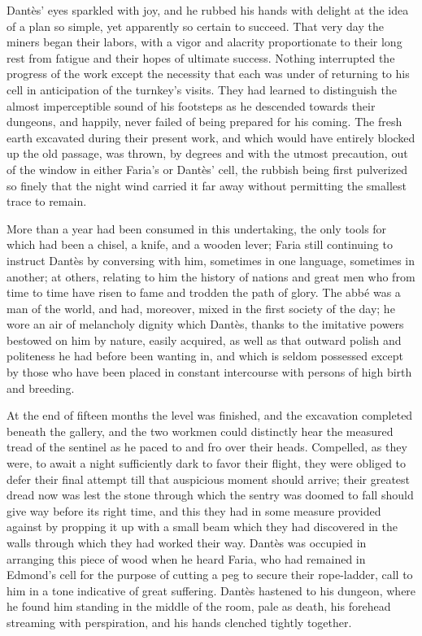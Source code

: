 Dantès’ eyes sparkled with joy, and he rubbed his hands with delight at
the idea of a plan so simple, yet apparently so certain to succeed.
That very day the miners began their labors, with a vigor and alacrity
proportionate to their long rest from fatigue and their hopes of
ultimate success. Nothing interrupted the progress of the work except
the necessity that each was under of returning to his cell in
anticipation of the turnkey’s visits. They had learned to distinguish
the almost imperceptible sound of his footsteps as he descended towards
their dungeons, and happily, never failed of being prepared for his
coming. The fresh earth excavated during their present work, and which
would have entirely blocked up the old passage, was thrown, by degrees
and with the utmost precaution, out of the window in either Faria’s or
Dantès’ cell, the rubbish being first pulverized so finely that the
night wind carried it far away without permitting the smallest trace to
remain.

More than a year had been consumed in this undertaking, the only tools
for which had been a chisel, a knife, and a wooden lever; Faria still
continuing to instruct Dantès by conversing with him, sometimes in one
language, sometimes in another; at others, relating to him the history
of nations and great men who from time to time have risen to fame and
trodden the path of glory. The abbé was a man of the world, and had,
moreover, mixed in the first society of the day; he wore an air of
melancholy dignity which Dantès, thanks to the imitative powers
bestowed on him by nature, easily acquired, as well as that outward
polish and politeness he had before been wanting in, and which is
seldom possessed except by those who have been placed in constant
intercourse with persons of high birth and breeding.

At the end of fifteen months the level was finished, and the excavation
completed beneath the gallery, and the two workmen could distinctly
hear the measured tread of the sentinel as he paced to and fro over
their heads. Compelled, as they were, to await a night sufficiently
dark to favor their flight, they were obliged to defer their final
attempt till that auspicious moment should arrive; their greatest dread
now was lest the stone through which the sentry was doomed to fall
should give way before its right time, and this they had in some
measure provided against by propping it up with a small beam which they
had discovered in the walls through which they had worked their way.
Dantès was occupied in arranging this piece of wood when he heard
Faria, who had remained in Edmond’s cell for the purpose of cutting a
peg to secure their rope-ladder, call to him in a tone indicative of
great suffering. Dantès hastened to his dungeon, where he found him
standing in the middle of the room, pale as death, his forehead
streaming with perspiration, and his hands clenched tightly together.

